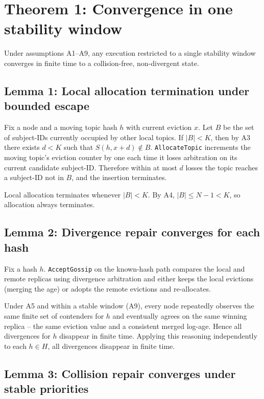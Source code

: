 \section{Theorem 1: Convergence in one stability window}

Under assumptions A1--A9, any execution restricted to a single stability
window converges in finite time to a collision-free, non-divergent state.

\subsection*{Lemma 1: Local allocation termination under bounded escape}

Fix a node and a moving topic hash $h$ with current eviction $x$. Let $B$
be the set of subject-IDs currently occupied by other local topics.
If $|B| < K$, then by A3 there exists $d < K$ such that
$S(h, x+d) \notin B$.
\texttt{AllocateTopic} increments the moving topic's eviction counter by
one each time it loses arbitration on its current candidate subject-ID.
Therefore within at most $d$ losses the topic reaches a subject-ID not in
$B$, and the insertion terminates.

Local allocation terminates whenever $|B| < K$. By A4, $|B| \le N - 1 < K$,
so allocation always terminates.

\subsection*{Lemma 2: Divergence repair converges for each hash}

Fix a hash $h$. \texttt{AcceptGossip} on the known-hash path compares the
local and remote replicas using divergence arbitration and either keeps the
local evictions (merging the age) or adopts the remote evictions and
re-allocates.

Under A5 and within a stable window (A9), every node repeatedly observes
the same finite set of contenders for $h$ and eventually agrees on the same
winning replica -- the same eviction value and a consistent merged
log-age. Hence all divergences for $h$ disappear in finite time. Applying
this reasoning independently to each $h \in H$, all divergences disappear
in finite time.

\subsection*{Lemma 3: Collision repair converges under stable priorities}

